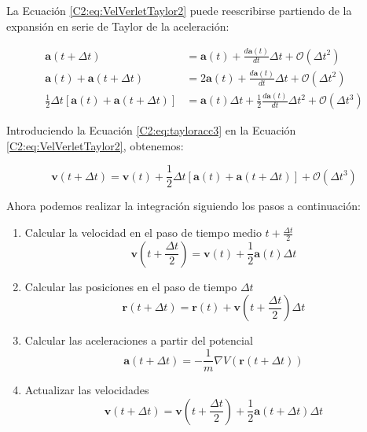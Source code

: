 La Ecuación \ref{C2:eq:VelVerletTaylor2} puede reescribirse partiendo de la expansión en serie de Taylor de la aceleración:

\begin{align}
\mathbf{a}(t+\Delta{}t) & = \mathbf{a}(t)+\frac{d\mathbf{a}(t)}{dt} \Delta{}t + \mathcal{O}(\Delta{}t^{2})
\label{C2:eq:tayloracc1} \\
\mathbf{a}(t)+\mathbf{a}(t+\Delta{}t) & = 2\mathbf{a}(t)+\frac{d\mathbf{a}(t)}{dt} \Delta{}t + \mathcal{O}(\Delta{}t^{2})
\label{C2:eq:tayloracc2} \\
\frac{1}{2}\Delta{}t\left[\mathbf{a}(t)+\mathbf{a}(t+\Delta{}t)\right] & = \mathbf{a}(t)\Delta{}t+\frac{1}{2}\frac{d\mathbf{a}(t)}{dt} \Delta{}t^{2} + \mathcal{O}(\Delta{}t^{3})
\label{C2:eq:tayloracc3}
\end{align}

Introduciendo la Ecuación \ref{C2:eq:tayloracc3} en la Ecuación \ref{C2:eq:VelVerletTaylor2}, obtenemos:

\begin{equation}
\mathbf{v}(t+\Delta{}t) = \mathbf{v}(t)+\frac{1}{2}\Delta{}t\left[\mathbf{a}(t)+\mathbf{a}(t+\Delta{}t)\right] + \mathcal{O}(\Delta{}t^{3})
\label{C2:eq:VelVerletTaylor3}
\end{equation}

Ahora podemos realizar la integración siguiendo los pasos a continuación:

\begin{enumerate}
	\item Calcular la velocidad en el paso de tiempo medio $t+\frac{\Delta{}t}{2}$
	\begin{equation}
	\mathbf{v}\left(t+\frac{\Delta{}t}{2}\right) = \mathbf{v}(t) + \frac{1}{2}\mathbf{a}(t)\Delta{}t
	\end{equation}
	\item Calcular las posiciones en el paso de tiempo $\Delta{}t$
	\begin{equation}
	\mathbf{r}(t+\Delta{}t) = \mathbf{r}(t) + \mathbf{v}\left(t+\frac{\Delta{}t}{2}\right)\Delta{}t
	\end{equation}
	\item Calcular las aceleraciones a partir del potencial
	\begin{equation}
	\mathbf{a}(t+\Delta{}t) = -\frac{1}{m}\nabla{}V\left(\mathbf{r}(t+\Delta{}t)\right)
	\end{equation}
	\item Actualizar las velocidades
	\begin{equation}
	\mathbf{v}(t+\Delta{}t) = \mathbf{v}\left(t+\frac{\Delta{}t}{2}\right) + \frac{1}{2}\mathbf{a}\left(t + \Delta{}t\right)\Delta{}t
	\end{equation}
\end{enumerate}

